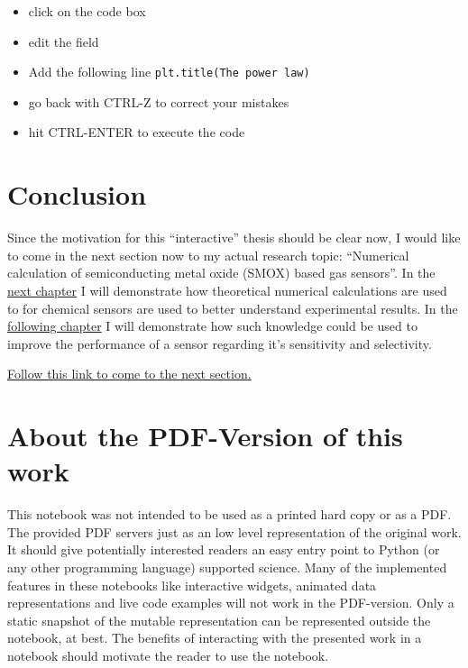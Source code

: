 \documentclass[11pt]{article}
\providecommand{\tightlist}{%
      \setlength{\itemsep}{0pt}\setlength{\parskip}{0pt}}
\begin{document}
\begin{itemize}
\tightlist
\item
  click on the code box
\item
  edit the field
\item
  Add the following line
  \texttt{plt.title(\textquotesingle{}The\ power\ law\textquotesingle{})}
\item
  go back with CTRL-Z to correct your mistakes
\item
  hit CTRL-ENTER to execute the code
\end{itemize}

    \hypertarget{conclusion}{%
\section{Conclusion}\label{conclusion}}

Since the motivation for this ``interactive'' thesis should be clear
now, I would like to come in the next section now to my actual research
topic: ``Numerical calculation of semiconducting metal oxide (SMOX)
based gas sensors''. In the \href{2-Grain-SMOX.ipynb}{next chapter} I
will demonstrate how theoretical numerical calculations are used to for
chemical sensors are used to better understand experimental results. In
the \href{3-Applying_theorie-to-practice.ipynb}{following chapter} I
will demonstrate how such knowledge could be used to improve the
performance of a sensor regarding it's sensitivity and selectivity.

\href{2-Grain-SMOX.ipynb}{Follow this link to come to the next section.}

    \hypertarget{about-the-pdf-version-of-this-work}{%
\section{About the PDF-Version of this
work}\label{about-the-pdf-version-of-this-work}}

This notebook was not intended to be used as a printed hard copy or as a
PDF. The provided PDF servers just as an low level representation of the
original work. It should give potentially interested readers an easy
entry point to Python (or any other programming language) supported
science. Many of the implemented features in these notebooks like
interactive widgets, animated data representations and live code
examples will not work in the PDF-version. Only a static snapshot of the
mutable representation can be represented outside the notebook, at best.
The benefits of interacting with the presented work in a notebook should
motivate the reader to use the notebook.
\end{document}

